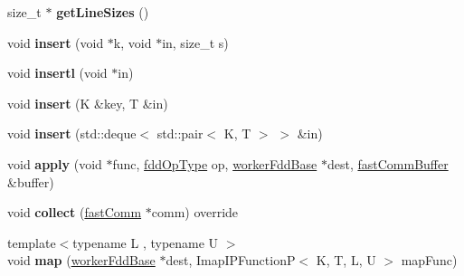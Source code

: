 \begin{DoxyCompactItemize}
\item 
\hypertarget{classfaster_1_1__workerIFdd_a9c0862beb4226e84a7b8f82f8841feac}{}\label{classfaster_1_1__workerIFdd_a9c0862beb4226e84a7b8f82f8841feac} 
size\+\_\+t $\ast$ {\bfseries get\+Line\+Sizes} ()
\item 
\hypertarget{classfaster_1_1__workerIFdd_aa806f1fef09dbeaaca74b09821e60935}{}\label{classfaster_1_1__workerIFdd_aa806f1fef09dbeaaca74b09821e60935} 
void {\bfseries insert} (void $\ast$k, void $\ast$in, size\+\_\+t s)
\item 
\hypertarget{classfaster_1_1__workerIFdd_a0c1716a3b4fb62fa1c4c9ffe95761ef4}{}\label{classfaster_1_1__workerIFdd_a0c1716a3b4fb62fa1c4c9ffe95761ef4} 
void {\bfseries insertl} (void $\ast$in)
\item 
\hypertarget{classfaster_1_1__workerIFdd_ac248aade1f81e85a4f8a48ba8b6fb9b7}{}\label{classfaster_1_1__workerIFdd_ac248aade1f81e85a4f8a48ba8b6fb9b7} 
void {\bfseries insert} (K \&key, T \&in)
\item 
\hypertarget{classfaster_1_1__workerIFdd_a02d3affac82eaf9e1fe524e5cbcd44d1}{}\label{classfaster_1_1__workerIFdd_a02d3affac82eaf9e1fe524e5cbcd44d1} 
void {\bfseries insert} (std\+::deque$<$ std\+::pair$<$ K, T $>$ $>$ \&in)
\item 
\hypertarget{classfaster_1_1__workerIFdd_aa9bd2045e6a85cd39f868ad50fbcb5c4}{}\label{classfaster_1_1__workerIFdd_aa9bd2045e6a85cd39f868ad50fbcb5c4} 
void {\bfseries apply} (void $\ast$func, \hyperlink{namespacefaster_a64379512d12d41c6e58f176939abfd80}{fdd\+Op\+Type} op, \hyperlink{classfaster_1_1workerFddBase}{worker\+Fdd\+Base} $\ast$dest, \hyperlink{classfaster_1_1fastCommBuffer}{fast\+Comm\+Buffer} \&buffer)
\item 
\hypertarget{classfaster_1_1__workerIFdd_a256bac01a1de34d3debeca359783f9f6}{}\label{classfaster_1_1__workerIFdd_a256bac01a1de34d3debeca359783f9f6} 
void {\bfseries collect} (\hyperlink{classfaster_1_1fastComm}{fast\+Comm} $\ast$comm) override
\item 
\hypertarget{classfaster_1_1__workerIFdd_a4038e3b76165af8c5b7e867336ec1bce}{}\label{classfaster_1_1__workerIFdd_a4038e3b76165af8c5b7e867336ec1bce} 
{\footnotesize template$<$typename L , typename U $>$ }\\void {\bfseries map} (\hyperlink{classfaster_1_1workerFddBase}{worker\+Fdd\+Base} $\ast$dest, Imap\+I\+P\+FunctionP$<$ K, T, L, U $>$ map\+Func)
\item 
\hypertarget{classfaster_1_1__workerIFdd_a183e0438a65c27ba0b5182679f87afb9}{}\label{classfaster_1_1__workerIFdd_a183e0438a65c27ba0b5182679f87afb9} 

\end{DoxyCompactItemize}
